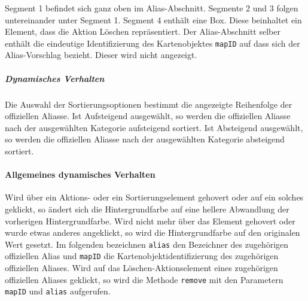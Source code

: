 Segment 1 befindet sich ganz oben im Alias-Abschnitt. Segmente 2 und 3 folgen untereinander unter Segment 1.
Segment 4 enthält eine Box. Diese beinhaltet ein Element, dass die Aktion \dq Löschen \dq{} repräsentiert.
Der Alias-Abschnitt selber enthält die eindeutige Identifizierung des Kartenobjektes \verb#mapID# auf dass sich der Alias-Vorschlag bezieht. Dieser wird nicht angezeigt.

\subparagraph*{Dynamisches Verhalten}
Die Auswahl der Sortierungsoptionen bestimmt die angezeigte Reihenfolge der offiziellen Aliasse.
Ist \dq Aufsteigend \dq{} ausgewählt, so werden die offiziellen Aliasse nach der ausgewählten Kategorie aufsteigend sortiert.
Ist \dq Absteigend \dq{} ausgewählt, so werden die offiziellen Aliasse nach der ausgewählten Kategorie absteigend sortiert.

\paragraph*{Allgemeines dynamisches Verhalten}
Wird über ein Aktions- oder ein Sortierungselement gehovert oder auf ein solches geklickt, so ändert sich die Hintergrundfarbe auf eine hellere Abwandlung der vorherigen Hintergrundfarbe.
Wird nicht mehr über das Element gehovert oder wurde etwas anderes angeklickt, so wird die Hintergrundfarbe auf den originalen Wert gesetzt.
Im folgenden bezeichnen \verb#alias# den Bezeichner des zugehörigen offiziellen Alias und \verb#mapID# die Kartenobjektidentifizierung des zugehörigen offiziellen Aliases.
Wird auf das Löschen-Aktionselement eines zugehörigen offiziellen Aliases geklickt, so wird die Methode \verb#remove# mit den Parametern \verb#mapID# und \verb#alias# aufgerufen. 